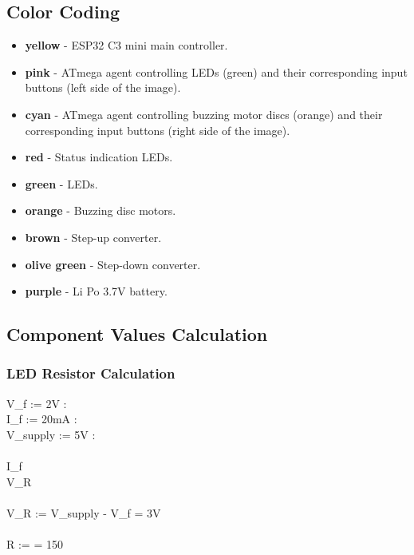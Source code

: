 \documentclass[a4paper]{article}
\begin{document}
\subsection{Color Coding}

\begin{itemize}
\item \textbf{yellow} - ESP32 C3 mini main controller.
\item \textbf{pink} - ATmega agent controlling LEDs (green) and their corresponding input buttons (left side of the image).
\item \textbf{cyan} - ATmega agent controlling buzzing motor discs (orange) and their corresponding input buttons (right side of the image).
\item \textbf{red} - Status indication LEDs.
\item \textbf{green} - LEDs.
\item \textbf{orange} - Buzzing disc motors.
\item \textbf{brown} - Step-up converter.
\item \textbf{olive green} - Step-down converter.
\item \textbf{purple} - Li Po 3.7V battery.
\end{itemize}





\subsection{Component Values Calculation}

\subsubsection{LED Resistor Calculation}

V_f := 2V : \\
I_f := 20mA : \\
V_{supply} := 5V : \\
\\
I_f  \\
V_R  \\
\\
V_R := V_{supply} - V_f = 3V \\
\\
R :=  = 150 \Omega
\\
\\
\end{document}
